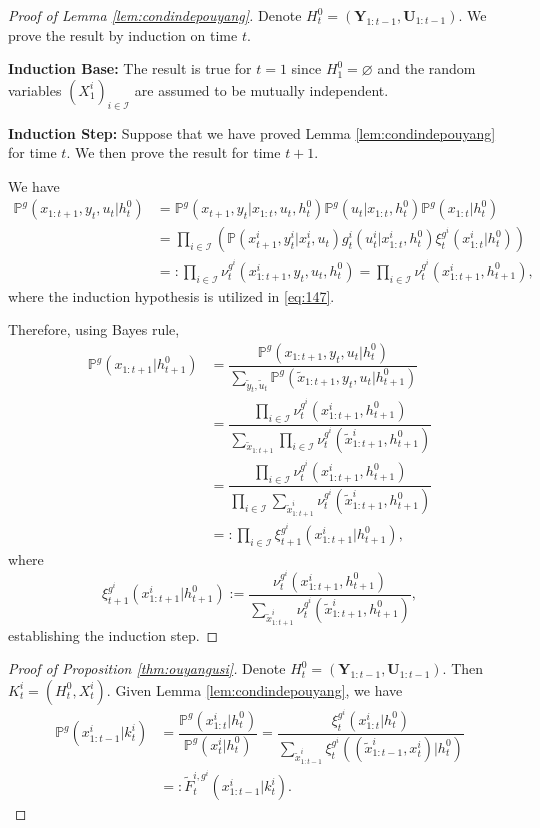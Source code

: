 \documentclass[pdflatex,sn-basic]{sn-jnl}
\renewcommand{\Pr}{\mathbb{P}}
\newcommand{\bY}{\mathbf{Y}}
\newcommand{\bU}{\mathbf{U}}
\newcommand{\Comp}{K}
\newcommand{\comp}{k}
\theoremstyle{thmstyleone}%
\theoremstyle{thmstyletwo}%
\theoremstyle{thmstylethree}%
\begin{document}
\begin{appendices}
\begin{proof}[Proof of Lemma \ref{lem:condindepouyang}]
	Denote $H_t^0=(\bY_{1:t-1}, \bU_{1:t-1})$. We prove the result by induction on time $t$.
	
	\textbf{Induction Base:} The result is true for $t=1$ since $H_1^0=\varnothing$ and the random variables $(X_1^i)_{i\in\mathcal{I}}$ are assumed to be mutually independent. 
	
	\textbf{Induction Step:} Suppose that we have proved Lemma \ref{lem:condindepouyang} for time $t$. We then prove the result for time $t+1$.
	
	We have
	\begin{align}
		\Pr^g(x_{1:t+1}, y_t, u_t|h_t^0) &= \Pr^g(x_{t+1}, y_t|x_{1:t}, u_t, h_t^0)\Pr^g(u_t|x_{1:t}, h_t^0)\Pr^g(x_{1:t}| h_t^0)\\
		&=\prod_{i\in\mathcal{I}} \left(\Pr(x_{t+1}^i, y_t^i|x_t^i, u_t) g_t^i(u_t^i|x_{1:t}^i, h_t^0) \xi_t^{g^i}(x_{1:t}^i| h_t^0) \right)\label{eq:147}\\
		&=:\prod_{i\in\mathcal{I}} \nu_t^{g^i}(x_{1:t+1}^i, y_t, u_t, h_t^0) = \prod_{i\in\mathcal{I}} \nu_t^{g^i}(x_{1:t+1}^i, h_{t+1}^0),
	\end{align}
    {where the induction hypothesis is utilized in \eqref{eq:147}.}
	
	Therefore, {using Bayes rule,}
	\begin{align}
		\Pr^g(x_{1:t+1}| h_{t+1}^0) &= \dfrac{\Pr^g(x_{1:t+1}, y_t, u_t| h_{t}^0)}{\sum_{\tilde{y}_t, \tilde{u}_t} \Pr^g(\tilde{x}_{1:t+1}, y_t, u_t| h_{t+1}^0)}\\
		&=\dfrac{\prod_{i\in\mathcal{I}} \nu_t^{g^i}(x_{1:t+1}^i, h_{t+1}^0)}{\sum_{\tilde{x}_{1:t+1}}\prod_{i\in\mathcal{I}} \nu_t^{g^i}(\tilde{x}_{1:t+1}^i, h_{t+1}^0)}\\
		&=\dfrac{\prod_{i\in\mathcal{I}} \nu_t^{g^i}(x_{1:t+1}^i, h_{t+1}^0)}{\prod_{i\in\mathcal{I}} \sum_{\tilde{x}_{1:t+1}^i} \nu_t^{g^i}(\tilde{x}_{1:t+1}^i, h_{t+1}^0)}\\
		&=:\prod_{i\in\mathcal{I}} \xi_{t+1}^{g^i} (x_{1:t+1}^i| h_{t+1}^0),
	\end{align}
	where
	\begin{equation}
		\xi_{t+1}^{g^i} (x_{1:t+1}^i| h_{t+1}^0) := \dfrac{ \nu_t^{g^i}(x_{1:t+1}^i, h_{t+1}^0)}{ \sum_{\tilde{x}_{1:t+1}^i} \nu_t^{g^i}(\tilde{x}_{1:t+1}^i, h_{t+1}^0)},
	\end{equation}
	establishing the induction step.
\end{proof}

\begin{proof}[Proof of Proposition \ref{thm:ouyangusi}]
	Denote $H_t^0=(\bY_{1:t-1}, \bU_{1:t-1})$. Then $\Comp_t^i=(H_t^0, X_t^i)$. Given Lemma \ref{lem:condindepouyang}, we have
	\begin{align}
		\Pr^{g}(x_{1:t-1}^i|\comp_t^i) &= \dfrac{\Pr^g(x_{1:t}^i|h_t^0)}{\Pr^g(x_{t}^i|h_t^0)}=\dfrac{\xi_t^{g^i}(x_{1:t}^i|h_t^0) }{\sum_{\tilde{x}_{1:t-1}^i} \xi_t^{g^i}((\tilde{x}_{1:t-1}^i, x_{t}^i)|h_t^0)}\\
		&=:\tilde{F}_t^{i, g^i}(x_{1:t-1}^i|\comp_t^i).
	\end{align}
	

\end{proof}
\end{appendices}
\end{document}
